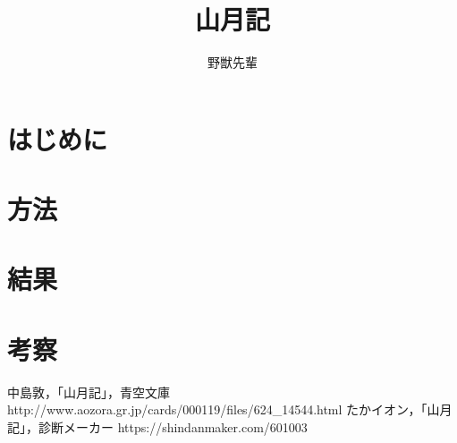 \documentclass{jsarticle}
\begin{document}
\title{山月記}
\author{野獣先輩}

\maketitle
\thispagestyle{empty}

\section{はじめに}

\section{方法}

\section{結果}

\section{考察}

\begin{thebibliography}{2}
 中島敦，「山月記」，青空文庫 http://www.aozora.gr.jp/cards/000119/files/624\_14544.html
 たかイオン，「山月記」，診断メーカー https://shindanmaker.com/601003
\end{thebibliography}
\end{document}
